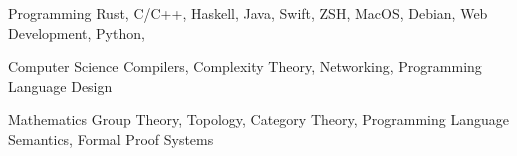 


\begin{cvskills}


\cvskill
{Programming} %
{Rust, C/C++, Haskell, Java, Swift, ZSH, MacOS, Debian, Web Development, Python, } %


\cvskill
{Computer Science} %
{Compilers, Complexity Theory, Networking, Programming Language Design} %


\cvskill
{Mathematics} %
{Group Theory, Topology, Category Theory, Programming Language Semantics, Formal Proof Systems} %


\end{cvskills}
